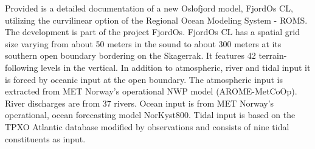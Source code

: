 Provided is a detailed documentation of a new Oslofjord model, FjordOs CL, utilizing the curvilinear option of the Regional Ocean Modeling System - ROMS. The development is part of the project FjordOs. FjordOs CL has a spatial grid size varying from about 50 meters in the {\DR} sound to about 300 meters at its southern open boundary bordering on the Skagerrak. It features 42 terrain-following levels in the vertical. In addition to atmospheric, river and tidal input it is forced by oceanic input at the open boundary. The atmospheric input is extracted from MET Norway's operational NWP model (AROME-MetCoOp). River discharges are from 37 rivers. Ocean input is from MET Norway's operational, ocean forecasting model NorKyst800. Tidal input is based on the TPXO Atlantic database modified by observations and consists of nine tidal constituents as input.
